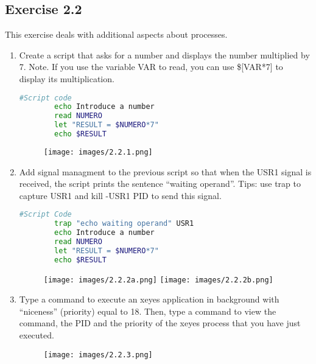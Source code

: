 \documentclass[12pt, titlepage,]{article}
\begin{document}
 \subsection{Exercise 2.2}

 This exercise deals with additional aspects about processes. 

 \begin{enumerate}
\item Create a script that asks for a number and displays the number multiplied by 7. Note. If you use the variable VAR to read, you can use \$[VAR*7] to display its multiplication. 
      \begin{lstlisting}[language=Bash]    
        #Script code
        echo Introduce a number
        read NUMERO
        let "RESULT = $NUMERO*7"
        echo $RESULT
      \end{lstlisting}
    
\begin{figure}[h] %
    \centering
    \texttt{[image: images/2.2.1.png]}
\end{figure}
      
      
 \item Add signal managment to the previous script so that when the USR1 signal is received, the script prints the sentence “waiting operand”. Tips: use trap to capture USR1 and kill -USR1 PID to send this signal. 
        \begin{lstlisting}[language=Bash]    
        #Script Code
        trap "echo waiting operand" USR1
        echo Introduce a number
        read NUMERO
        let "RESULT = $NUMERO*7"
        echo $RESULT
        \end{lstlisting}
\begin{figure}[h] %
    \centering
    \texttt{[image: images/2.2.2a.png]}
    \texttt{[image: images/2.2.2b.png]}
\end{figure}
\clearpage
        

 \item Type a command to execute an xeyes application in background with “niceness” (priority) equal to 18. Then, type a command to view the command, the PID and the priority of the xeyes process that you have just executed.
\begin{figure}[h] %
    \centering
    \texttt{[image: images/2.2.3.png]}
\end{figure}
 
\end{enumerate}
\end{document}
